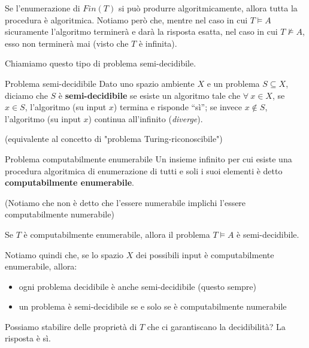 \documentclass[a4paper,11pt]{report}
\begin{document}
Se l'enumerazione di \( Fin(T) \) si può produrre algoritmicamente, allora tutta la procedura è algoritmica. Notiamo però che, mentre nel caso in cui \( T \vDash A \) sicuramente l'algoritmo terminerà e darà la risposta esatta, nel caso in cui \( T \not\vDash A \), esso non terminerà mai (visto che \( T \) è infinita).

Chiamiamo questo tipo di problema semi-decidibile.

\begin{defframe}{Problema semi-decidibile}{}
    Dato uno spazio ambiente \( X \) e un problema \( S \subseteq X\), diciamo che \( S \) è \textbf{semi-decidibile} se esiste un algoritmo tale che \( \forall \ x \in X \), se \( x\in S \), l'algoritmo (su input \( x \)) termina e risponde ``sì''; se invece \( x \not\in S \), l'algoritmo (su input \( x \)) continua all'infinito (\textit{diverge}).

    \begin{gframe}{}
    (equivalente al concetto di "problema Turing-riconoscibile")
    \end{gframe}
\end{defframe}

\begin{defframe}{Problema computabilmente enumerabile}{}
    Un insieme infinito per cui esiste una procedura algoritmica di enumerazione di tutti e soli i suoi elementi è detto \textbf{computabilmente enumerabile}.
\end{defframe}

(Notiamo che non è detto che l'essere numerabile implichi l'essere computabilmente numerabile)

\begin{thmframe}{}{}
    Se \( T \) è computabilmente enumerabile, allora il problema \( T\vDash A \) è semi-decidibile.
\end{thmframe}

Notiamo quindi che, se lo spazio \( X \) dei possibili input è computabilmente enumerabile, allora:
    \begin{itemize}
        \item ogni problema decidibile è anche semi-decidibile {\small\color{gray}(questo sempre)}
        \item un problema è semi-decidibile se e solo se è computabilmente numerabile
    \end{itemize}


Possiamo stabilire delle proprietà di \( T \) che ci garantiscano la decidibilità?
La risposta è sì.
\end{document}
